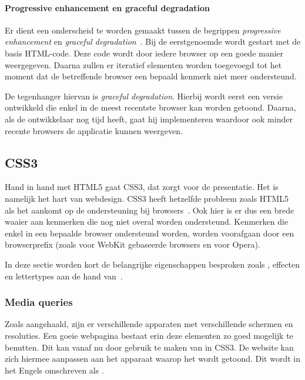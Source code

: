 \paragraph{Progressive enhancement en graceful degradation}
\label{par:progressive-enhancement}
Er dient een onderscheid te worden gemaakt tussen de begrippen \emph{progressive enhancement} en \emph{graceful degradation}~\cite{Hens2012}. 
Bij de eerstgenoemde wordt gestart met de basis HTML-code.
Deze code wordt door iedere browser op een goede manier weergegeven. 
Daarna zullen er iteratief elementen worden toegevoegd tot het moment dat de betreffende browser een bepaald kenmerk niet meer ondersteund.

De tegenhanger hiervan is \emph{graceful degradation}. 
Hierbij wordt eerst een versie ontwikkeld die enkel in de meest recentste browser kan worden getoond. 
Daarna, als de ontwikkelaar nog tijd heeft, gaat hij  implementeren waardoor ook minder recente browsers de applicatie kunnen weergeven.

\subsection{CSS3}
\label{ref:css3}
Hand in hand met HTML5 gaat CSS3, dat zorgt voor de presentatie. 
Het is namelijk het hart van webdesign. 
CSS3 heeft hetzelfde probleem zoals HTML5 als het aankomt op de ondersteuning bij browsers~\cite{MacDonald2011}. 
Ook hier is er dus een brede waaier aan kenmerken die nog niet overal worden ondersteund. 
Kenmerken die enkel in een bepaalde browser ondersteund worden, worden voorafgaan door een browserprefix (zoals  voor WebKit gebaseerde browsers en  voor Opera).

In deze sectie worden kort de belangrijke eigenschappen besproken zoals , effecten en lettertypes aan de hand van~\cite{MacDonald2011}.

\subsubsection{Media queries}
Zoals aangehaald, zijn er verschillende apparaten met verschillende schermen en resoluties. 
Een goeie webpagina bestaat erin deze elementen zo goed mogelijk te benutten. 
Dit kan vanaf nu door gebruik te maken van  in CSS3. 
De website kan zich hiermee aanpassen aan het apparaat waarop het wordt getoond. 
Dit wordt in het Engels omschreven als .


